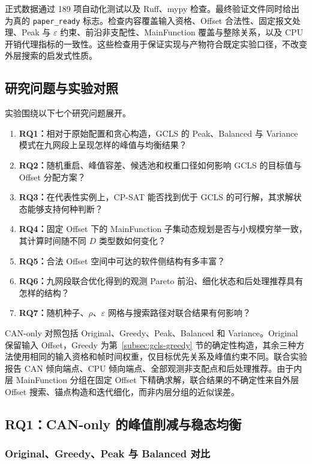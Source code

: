 \documentclass[UTF8,a4paper,twoside,zihao=-4]{ctexart}
\numberwithin{equation}{section}
\numberwithin{figure}{section}
\numberwithin{table}{section}
\theoremstyle{definition}
\numberwithin{algocf}{section}
\begin{document}
正式数据通过 189 项自动化测试以及 Ruff、mypy 检查。最终验证文件同时给出为真的 \texttt{paper\_ready} 标志。检查内容覆盖输入资格、Offset 合法性、固定报文处理、Peak 与 $\varepsilon$ 约束、前沿非支配性、MainFunction 覆盖与整除关系，以及 CPU 开销代理指标的一致性。这些检查用于保证实现与产物符合既定实验口径，不改变外层搜索的启发式性质。

\subsection{研究问题与实验对照}
\label{subsec:exp-rqs}

实验围绕以下七个研究问题展开。
\begin{enumerate}
 \item \textbf{RQ1：}相对于原始配置和贪心构造，GCLS 的 Peak、Balanced 与 Variance 模式在九网段上呈现怎样的峰值与均衡结果？
 \item \textbf{RQ2：}随机重启、峰值容差、候选池和权重口径如何影响 GCLS 的目标值与 Offset 分配方案？
 \item \textbf{RQ3：}在代表性实例上，CP-SAT 能否找到优于 GCLS 的可行解，其求解状态能够支持何种判断？
 \item \textbf{RQ4：}固定 Offset 下的 MainFunction 子集动态规划是否与小规模穷举一致，其计算时间随不同 $D$ 类型数如何变化？
 \item \textbf{RQ5：}合法 Offset 空间中可达的软件侧结构有多丰富？
 \item \textbf{RQ6：}九网段联合优化得到的观测 Pareto 前沿、细化状态和后处理推荐具有怎样的结构？
 \item \textbf{RQ7：}随机种子、$\rho$、$\varepsilon$ 网格与搜索路径对联合结果有何影响？
\end{enumerate}

CAN-only 对照包括 Original、Greedy、Peak、Balanced 和 Variance。Original 保留输入 Offset，Greedy 为第~\ref{subsec:gcls-greedy} 节的确定性构造，其余三种方法使用相同的输入资格和帧时间权重，仅目标优先关系及峰值约束不同。联合实验报告 CAN 倾向端点、CPU 倾向端点、全部观测非支配点和后处理推荐。由于内层 MainFunction 分组在固定 Offset 下精确求解，联合结果的不确定性来自外层 Offset 搜索、锚点构造和迭代细化，而非内层分组的近似误差。

\subsection{RQ1：CAN-only 的峰值削减与稳态均衡}
\label{subsec:exp-rq1}

\subsubsection{Original、Greedy、Peak 与 Balanced 对比}
\label{subsubsec:exp-rq1-main}
\end{document}
